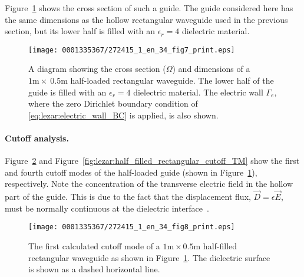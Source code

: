 Figure~\ref{fig:lezar:half_filled_rectangular_guide} shows the cross
section of such a guide. The guide considered here has the same dimensions
as the hollow rectangular waveguide used in the previous section, but
its lower half is filled with an $\epsilon_r = 4$ dielectric material.
\begin{figure}[!t]
    \centering
    \texttt{[image: 0001335367/272415\_1\_en\_34\_fig7\_print.eps]}
    \caption{A diagram showing the cross section ($\Omega$)
    and dimensions of a $1\text{m}\times~0.5\text{m}$ half-loaded
    rectangular waveguide. The lower half of the guide is filled with
    an $\epsilon_r = 4$ dielectric material. The electric
    wall $\Gamma_e$, where the zero Dirichlet boundary condition of
    \eqref{eq:lezar:electric_wall_BC} is applied, is also shown.}
    \label{fig:lezar:half_filled_rectangular_guide}\vspace*{6pt}
\end{figure}

\paragraph{Cutoff analysis.}

Figure~\ref{fig:lezar:half_filled_rectangular_cutoff_TE} and
Figure~\ref{fig:lezar:half_filled_rectangular_cutoff_TM} show the
first and fourth cutoff modes of the half-loaded guide (shown in
Figure~\ref{fig:lezar:half_filled_rectangular_guide}), respectively. Note
the concentration of the transverse electric field in the hollow part of
the guide. This is due to the fact that the displacement flux, $\vec{D}
= \epsilon\vec{E}$, must be normally continuous at the dielectric
interface~\citep{Pozar2005, Smith1997}.

\begin{figure}[!t]
\centering
\texttt{[image: 0001335367/272415\_1\_en\_34\_fig8\_print.eps]}
\caption{The first calculated cutoff mode of a
$1\text{m}\times0.5\text{m}$ half-filled rectangular waveguide as shown
in Figure~\ref{fig:lezar:half_filled_rectangular_guide}. The dielectric
surface is shown as a dashed horizontal line.}
\label{fig:lezar:half_filled_rectangular_cutoff_TE}\vspace*{6pt}
\end{figure}

